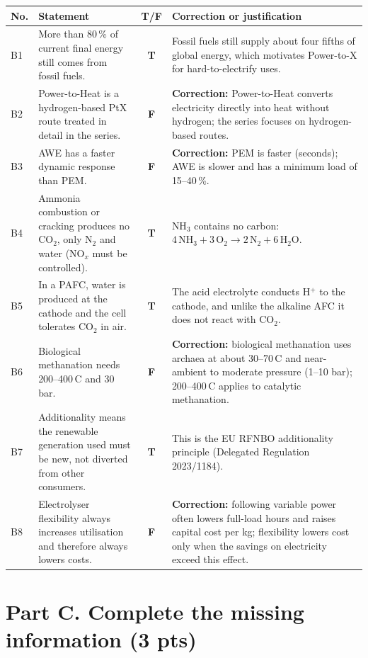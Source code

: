 \documentclass[11pt,a4paper]{article}
\newcommand{\degC}{\,\textdegree C}
\newcommand{\fillin}[1]{\textcolor{ans}{\textbf{#1}}}
\newcommand{\pts}[1]{\hfill{\normalsize\textbf{(#1)}}}
\begin{document}
{\small
\renewcommand{\arraystretch}{1.35}
\begin{tabularx}{\linewidth}{@{}p{0.6cm}>{\raggedright\arraybackslash}p{5.6cm}c>{\raggedright\arraybackslash}X@{}}
\toprule
\textbf{No.} & \textbf{Statement} & \textbf{T/F} & \textbf{Correction or justification}\\
\midrule
B1 & More than 80\,\% of current final energy still comes from fossil fuels. & \fillin{T} &
  Fossil fuels still supply about four fifths of global energy, which motivates Power-to-X for hard-to-electrify uses. \\
B2 & Power-to-Heat is a hydrogen-based PtX route treated in detail in the series. & \fillin{F} &
  \textbf{Correction:} Power-to-Heat converts electricity directly into heat without hydrogen; the series focuses on hydrogen-based routes. \\
B3 & AWE has a faster dynamic response than PEM. & \fillin{F} &
  \textbf{Correction:} PEM is faster (seconds); AWE is slower and has a minimum load of 15--40\,\%. \\
B4 & Ammonia combustion or cracking produces no CO$_2$, only N$_2$ and water (NO$_x$ must be controlled). & \fillin{T} &
  NH$_3$ contains no carbon: $\mathrm{4\,NH_3 + 3\,O_2 \rightarrow 2\,N_2 + 6\,H_2O}$. \\
B5 & In a PAFC, water is produced at the cathode and the cell tolerates CO$_2$ in air. & \fillin{T} &
  The acid electrolyte conducts H$^+$ to the cathode, and unlike the alkaline AFC it does not react with CO$_2$. \\
B6 & Biological methanation needs 200--400\degC{} and 30 bar. & \fillin{F} &
  \textbf{Correction:} biological methanation uses archaea at about 30--70\degC{} and near-ambient to moderate pressure (1--10 bar); 200--400\degC{} applies to catalytic methanation. \\
B7 & Additionality means the renewable generation used must be new, not diverted from other consumers. & \fillin{T} &
  This is the EU RFNBO additionality principle (Delegated Regulation 2023/1184). \\
B8 & Electrolyser flexibility always increases utilisation and therefore always lowers costs. & \fillin{F} &
  \textbf{Correction:} following variable power often lowers full-load hours and raises capital cost per kg; flexibility lowers cost only when the savings on electricity exceed this effect. \\
\bottomrule
\end{tabularx}}

\section{Part C. Complete the missing information \pts{3 pts}}
\end{document}
